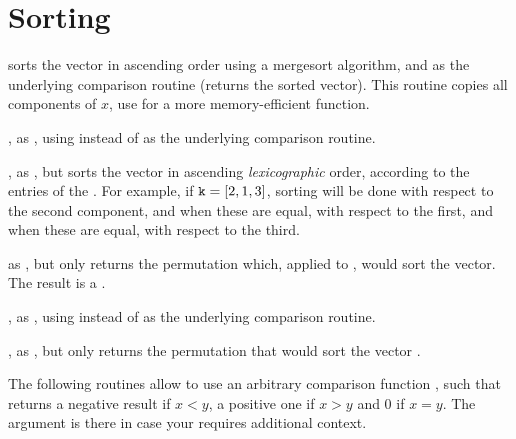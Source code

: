 





\section{Sorting}


 sorts the vector  in ascending order using a
mergesort algorithm, and  as the underlying comparison routine
(returns the sorted vector). This routine copies all components of $x$, use
 for a more memory-efficient function.

, as , using  instead of
 as the underlying comparison routine.

, as , but sorts the
vector  in ascending \emph{lexicographic} order, according to the
entries of the  . For example,  if ${\tt k} = [2,1,3]$,
sorting will be done with respect to the second component,  and when these
are  equal, with respect to the first,  and when these are equal,  with
respect to the third.


 as , but only returns the permutation
which, applied to , would sort the vector. The result is a
.

, as , using 
instead of  as the underlying comparison routine.

, as , but only
returns the permutation that would sort the vector .

 The following routines allow to use an
arbitrary comparison function ,
such that  returns a negative result if $x
< y$, a positive one if $x > y$ and 0 if $x = y$. The  argument is
there in case your  requires additional context.

